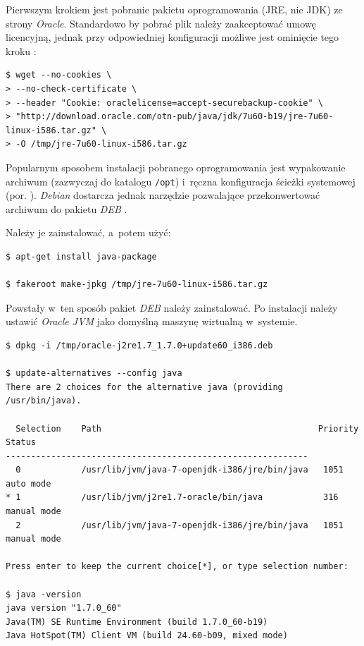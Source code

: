 \documentclass{article} %
\begin{document}
Pierwszym krokiem jest pobranie pakietu oprogramowania (JRE, nie JDK) ze strony \emph{Oracle}.
Standardowo by pobrać plik należy zaakceptować umowę licencyjną, jednak przy odpowiedniej konfiguracji możliwe jest ominięcie tego kroku \cite{downloading_oracle_java}:

\begin{lstlisting}[style=bash, caption={pobieranie \emph{Oracle JRE}}]
$ wget --no-cookies \
> --no-check-certificate \
> --header "Cookie: oraclelicense=accept-securebackup-cookie" \
> "http://download.oracle.com/otn-pub/java/jdk/7u60-b19/jre-7u60-linux-i586.tar.gz" \
> -O /tmp/jre-7u60-linux-i586.tar.gz
\end{lstlisting}

Popularnym sposobem instalacji pobranego oprogramowania jest wypakowanie archiwum (zazwyczaj do katalogu \texttt{/opt}) i~ręczna konfiguracja ścieżki systemowej (por. \cite{downloading_oracle_java}).
\emph{Debian} dostarcza jednak narzędzie pozwalające przekonwertować archiwum do pakietu \emph{DEB} \cite{installing_oracle_java_on_debian}.

Należy je zainstalować, a~potem użyć:

\begin{lstlisting}[style=bash, caption={budowa pakietu DEB z~\emph{Oracle JRE}}]
$ apt-get install java-package

$ fakeroot make-jpkg /tmp/jre-7u60-linux-i586.tar.gz
\end{lstlisting}

Powstały w~ten sposób pakiet \emph{DEB} należy zainstalować.
Po instalacji należy ustawić \emph{Oracle JVM} jako domyślną maszynę wirtualną w~systemie.

\begin{lstlisting}[style=bash, caption={instalacja i konfiguracja \emph{Oracle JRE}}]
$ dpkg -i /tmp/oracle-j2re1.7_1.7.0+update60_i386.deb

$ update-alternatives --config java
There are 2 choices for the alternative java (providing /usr/bin/java).

  Selection    Path                                           Priority   Status
------------------------------------------------------------
  0            /usr/lib/jvm/java-7-openjdk-i386/jre/bin/java   1051      auto mode
* 1            /usr/lib/jvm/j2re1.7-oracle/bin/java            316       manual mode
  2            /usr/lib/jvm/java-7-openjdk-i386/jre/bin/java   1051      manual mode

Press enter to keep the current choice[*], or type selection number:

$ java -version
java version "1.7.0_60"
Java(TM) SE Runtime Environment (build 1.7.0_60-b19)
Java HotSpot(TM) Client VM (build 24.60-b09, mixed mode)
\end{lstlisting}
\end{document}
